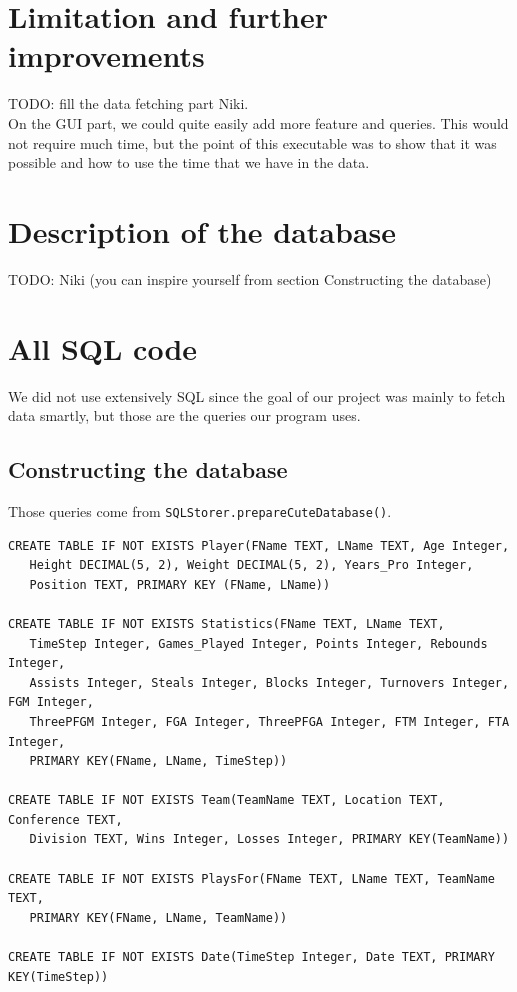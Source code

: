 \documentclass[paper=A4, fontsize=11pt]{scrartcl} %
\begin{document}
\section{Limitation and further improvements}
TODO: fill the data fetching part Niki.\\

On the GUI part, we could quite easily add more feature and queries. This would not require much time, but the point of this executable was to show that it was possible and how to use the time that we have in the data.

\section{Description of the database}
TODO: Niki (you can inspire yourself from section Constructing the database)

\newpage

\section{All SQL code}
We did not use extensively SQL since the goal of our project was mainly to fetch data smartly, but those are the queries our program uses.

\subsection{Constructing the database}
Those queries come from \verb!SQLStorer.prepareCuteDatabase()!.

\begin{verbatim}
CREATE TABLE IF NOT EXISTS Player(FName TEXT, LName TEXT, Age Integer,
   Height DECIMAL(5, 2), Weight DECIMAL(5, 2), Years_Pro Integer, 
   Position TEXT, PRIMARY KEY (FName, LName))
        
CREATE TABLE IF NOT EXISTS Statistics(FName TEXT, LName TEXT,
   TimeStep Integer, Games_Played Integer, Points Integer, Rebounds Integer,
   Assists Integer, Steals Integer, Blocks Integer, Turnovers Integer, FGM Integer,
   ThreePFGM Integer, FGA Integer, ThreePFGA Integer, FTM Integer, FTA Integer,
   PRIMARY KEY(FName, LName, TimeStep))
        
CREATE TABLE IF NOT EXISTS Team(TeamName TEXT, Location TEXT, Conference TEXT,
   Division TEXT, Wins Integer, Losses Integer, PRIMARY KEY(TeamName))
        
CREATE TABLE IF NOT EXISTS PlaysFor(FName TEXT, LName TEXT, TeamName TEXT,
   PRIMARY KEY(FName, LName, TeamName))
        
CREATE TABLE IF NOT EXISTS Date(TimeStep Integer, Date TEXT, PRIMARY KEY(TimeStep))
\end{verbatim}
\end{document}
